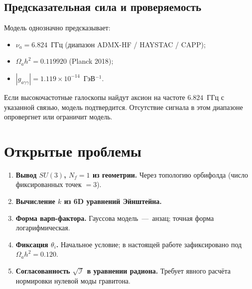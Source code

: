 \documentclass[12pt,a4paper]{article}
\numberwithin{equation}{section}
\begin{document}
\subsection{Предсказательная сила и проверяемость}
Модель однозначно предсказывает:
\begin{itemize}
\item $\nu_a = 6.824$~ГГц (диапазон ADMX-HF / HAYSTAC / CAPP);
\item $\Omega_a h^2 = 0.119920$ (Planck 2018);
\item $|g_{a\gamma\gamma}| = 1.119\times 10^{-14}$~ГэВ$^{-1}$.
\end{itemize}
Если высокочастотные галоскопы найдут аксион на частоте $6.824$~ГГц с 
указанной связью, модель подтвердится. Отсутствие сигнала в этом 
диапазоне опровергнет или ограничит модель.

\section{Открытые проблемы}
\begin{enumerate}
\item \textbf{Вывод $SU(3)$, $N_f=1$ из геометрии.} Через топологию 
орбифолда (число фиксированных точек $=3$).
\item \textbf{Вычисление $k$ из 6D уравнений Эйнштейна.}
\item \textbf{Форма варп-фактора.} Гауссова модель~---~анзац; 
точная форма логарифмическая.
\item \textbf{Фиксация $\theta_i$.} Начальное условие; в настоящей 
работе зафиксировано под $\Omega_a h^2 = 0.120$.
\item \textbf{Согласованность $\sqrt{\mathcal{I}}$ в уравнении радиона.}
Требует явного расчёта нормировки нулевой моды гравитона.
\end{enumerate}

\end{document}
